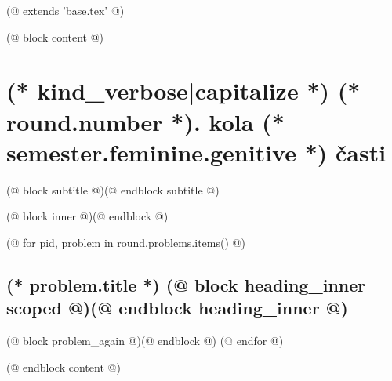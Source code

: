 (@ extends 'base.tex' @)

(@ block content @)
    \thispagestyle{seminar-booklet-first}

    \afterpage{\globaldefs=1\restoregeometry}

    \pagestyle{seminar-booklet-body}


    \section{%
        \texorpdfstring{%
            (* kind_verbose|capitalize *) (* round.number *). kola (* semester.feminine.genitive *) časti%
        }{%
            (* kind_verbose|capitalize *)%
        }%
    }
    (@ block subtitle @)(@ endblock subtitle @)

    \setcounter{volume}{(* volume.number *)}
    \setcounter{semester}{(* semester.number *)}
    \setcounter{round}{(* round.number *)}
    \setcounter{section}{(* round.number *)}
    (@ block inner @)(@ endblock @)

    (@ for pid, problem in round.problems.items() @)%
        \setcounter{problem}{(* problem.number *)}%
        \subsection{%
            \texorpdfstring{%
                \large \textbf{(* problem.title *)} \hfill \normalsize%
                (@ block heading_inner scoped @)(@ endblock heading_inner @)}{(* round.number *).(* problem.number *) (* problem.title *)}%
            \label{(* volume.id *)(* semester.id *)(* round.id *)(* problem.id *)-(* kind *)}%
        }%
        (@ block problem_again @)(@ endblock @)
    (@ endfor @)

(@ endblock content @)
